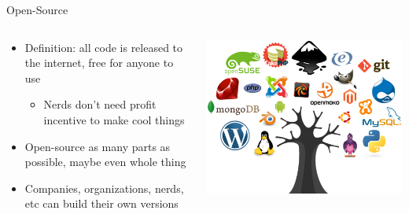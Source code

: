 \documentclass[aspectratio=169]{beamer}
\begin{document}
\begin{frame}{Open-Source}
\vspace{-0.3in}
\begin{columns}[T]
    \begin{column}[T]{0.5\textwidth}
        \begin{itemize}
            \item Definition: all code is released to the internet, free for anyone to use
            \begin{itemize}
                \item Nerds don't need profit incentive to make cool things
            \end{itemize}
            \item Open-source as many parts as possible, maybe even whole thing
            \item Companies, organizations, nerds, etc can build their own versions
        \end{itemize}
    \end{column}
    \begin{column}{0.5\textwidth}
        \includegraphics[width=\textwidth]{imgs/power_to_people/open-source.png}
    \end{column}
\end{columns}
\end{frame}
\end{document}
